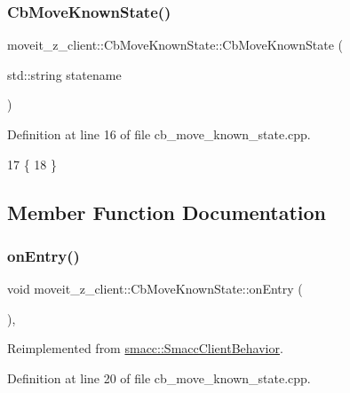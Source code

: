\subsubsection{\texorpdfstring{Cb\+Move\+Known\+State()}{CbMoveKnownState()}\hspace{0.1cm}{\footnotesize\ttfamily [2/2]}}
{\footnotesize\ttfamily moveit\+\_\+z\+\_\+client\+::\+Cb\+Move\+Known\+State\+::\+Cb\+Move\+Known\+State (\begin{DoxyParamCaption}\item[{std\+::string}]{statename }\end{DoxyParamCaption})}



Definition at line 16 of file cb\+\_\+move\+\_\+known\+\_\+state.\+cpp.


\begin{DoxyCode}
17 \{
18 \}
\end{DoxyCode}


\subsection{Member Function Documentation}
\mbox{\label{classmoveit__z__client_1_1CbMoveKnownState_a2ac90afe89043bbbf35c5b63eb428430}} 
\subsubsection{\texorpdfstring{on\+Entry()}{onEntry()}}
{\footnotesize\ttfamily void moveit\+\_\+z\+\_\+client\+::\+Cb\+Move\+Known\+State\+::on\+Entry (\begin{DoxyParamCaption}{ }\end{DoxyParamCaption})\hspace{0.3cm}{\ttfamily [override]}, {\ttfamily [virtual]}}



Reimplemented from \hyperlink{classsmacc_1_1SmaccClientBehavior_a7962382f93987c720ad432fef55b123f}{smacc\+::\+Smacc\+Client\+Behavior}.



Definition at line 20 of file cb\+\_\+move\+\_\+known\+\_\+state.\+cpp.


